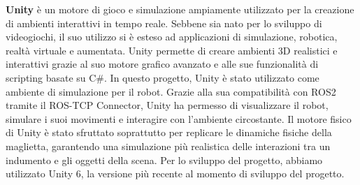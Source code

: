 \documentclass[11pt]{report}
\begin{document}
\textbf{Unity} \cite{Unity} è un motore di gioco e simulazione ampiamente utilizzato per la creazione di ambienti interattivi in tempo reale. Sebbene sia nato per lo sviluppo di videogiochi, il suo utilizzo si è esteso ad applicazioni di simulazione, robotica, realtà virtuale e aumentata. Unity permette di creare ambienti 3D realistici e interattivi grazie al suo motore grafico avanzato e alle sue funzionalità di scripting basate su C\#.
In questo progetto, Unity è stato utilizzato come ambiente di simulazione per il robot. Grazie alla sua compatibilità con ROS2 tramite il ROS-TCP Connector, Unity ha permesso di visualizzare il robot, simulare i suoi movimenti e interagire con l'ambiente circostante. Il motore fisico di Unity è stato sfruttato soprattutto per replicare le dinamiche fisiche della maglietta, garantendo una simulazione più realistica delle interazioni tra un indumento e gli oggetti della scena.
Per lo sviluppo del progetto, abbiamo utilizzato Unity 6, la versione più recente al momento di sviluppo del progetto.
\end{document}
